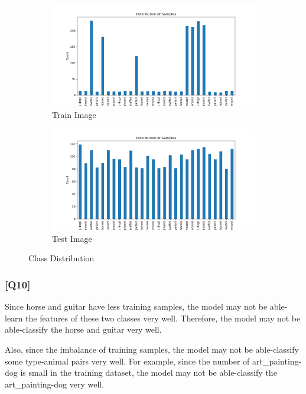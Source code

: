 \documentclass{article}
\begin{document}
\begin{figure}[h!]
    \centering
    \begin{subfigure}{0.45\textwidth}
        \includegraphics[width=\textwidth]{./pic/class_distribution_1641.png}
        \caption{Train Image}
    \end{subfigure}
    \hfill %
    \begin{subfigure}{0.45\textwidth}
        \includegraphics[width=\textwidth]{./pic/class_distribution_2723.png}
        \caption{Test Image}
    \end{subfigure}
    \caption{Class Distribution}
    \label{fig:class_distribution}
\end{figure}


\subsubsection*{[Q10]}
Since horse and guitar have less training samples, the model may not be able-learn the features of these two classes very well.
Therefore, the model may not be able-classify the horse and guitar very well.

Also, since the imbalance of training samples, the model may not be able-classify some type-animal pairs very well. For example, since the number of art\_painting-dog is small in the training dataset, the model may not be able-classify the art\_painting-dog very well.
\end{document}
